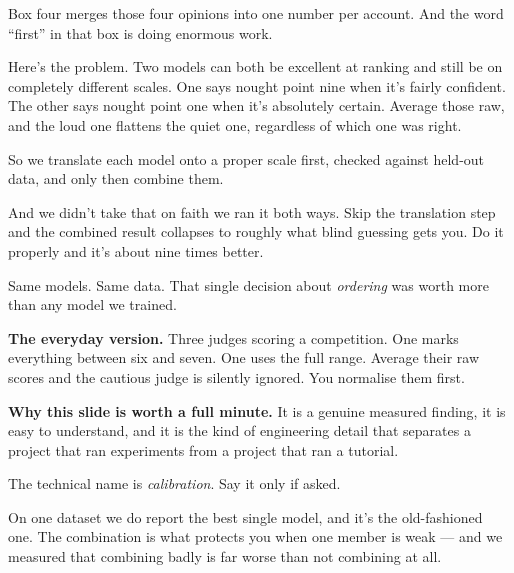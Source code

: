 \documentclass[11pt]{article}
\begin{document}

\begin{saythis}
Box four merges those four opinions into one number per account. And the word
``first'' in that box is doing enormous work.

Here's the problem. Two models can both be excellent at ranking and still be on
completely different scales. One says nought point nine when it's fairly
confident. The other says nought point one when it's absolutely certain.
Average those raw, and the loud one flattens the quiet one, regardless of which
one was right.

So we translate each model onto a proper scale first, checked against held-out
data, and only then combine them.

And we didn't take that on faith \bt we ran it both ways. Skip the translation
step and the combined result collapses to roughly what blind guessing gets you.
Do it properly and it's about nine times better.

Same models. Same data. That single decision about \emph{ordering} was worth
more than any model we trained.
\end{saythis}

\begin{means}
\textbf{The everyday version.} Three judges scoring a competition. One marks
everything between six and seven. One uses the full range. Average their raw
scores and the cautious judge is silently ignored. You normalise them first.

\textbf{Why this slide is worth a full minute.} It is a genuine measured
finding, it is easy to understand, and it is the kind of engineering detail
that separates a project that ran experiments from a project that ran a
tutorial.

The technical name is \emph{calibration}. Say it only if asked.
\end{means}

\begin{asked}
 On one dataset
we do report the best single model, and it's the old-fashioned one. The
combination is what protects you when one member is weak --- and we measured
that combining badly is far worse than not combining at all.
\end{asked}
\end{document}
